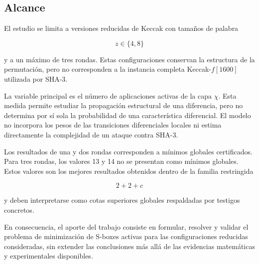 \subsection{Alcance}
\label{subsec:alcance}

El estudio se limita a versiones reducidas de Keccak con tamaños de palabra

\[
z \in \{4,8\}
\]

y a un máximo de tres rondas. Estas configuraciones conservan la estructura
de la permutación, pero no corresponden a la instancia completa
Keccak-$f[1600]$ utilizada por SHA-3.

La variable principal es el número de aplicaciones activas de la capa
$\chi$. Esta medida permite estudiar la propagación estructural de una
diferencia, pero no determina por sí sola la probabilidad de una
característica diferencial. El modelo no incorpora los pesos de las
transiciones diferenciales locales ni estima directamente la complejidad
de un ataque contra SHA-3.

Los resultados de una y dos rondas corresponden a mínimos globales
certificados. Para tres rondas, los valores 13 y 14 no se presentan como
mínimos globales. Estos valores son los mejores resultados obtenidos dentro
de la familia restringida

\[
2+2+c
\]

y deben interpretarse como cotas superiores globales respaldadas por
testigos concretos.

En consecuencia, el aporte del trabajo consiste en formular, resolver y
validar el problema de minimización de S-boxes activas para las
configuraciones reducidas consideradas, sin extender las conclusiones más
allá de las evidencias matemáticas y experimentales disponibles.
